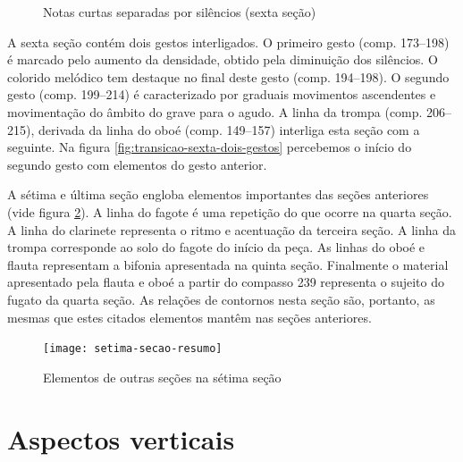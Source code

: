 \begin{figure}
  \centering


  \caption{Notas curtas separadas por silêncios (sexta seção)}
  \label{fig:sexta-secao-notas-curtas}
\end{figure}

A sexta seção contém dois gestos interligados. O primeiro gesto
(comp. 173--198) é marcado pelo aumento da densidade, obtido pela
diminuição dos silêncios. O colorido melódico tem destaque no final
deste gesto (comp. 194--198). O segundo gesto (comp. 199--214) é
caracterizado por graduais movimentos ascendentes e movimentação do
âmbito do grave para o agudo. A linha da trompa (comp. 206--215),
derivada da linha do oboé (comp. 149--157) interliga esta seção com a
seguinte. Na figura \ref{fig:transicao-sexta-dois-gestos} percebemos o
início do segundo gesto com elementos do gesto anterior.

A sétima e última seção engloba elementos importantes das seções
anteriores (vide figura \ref{fig:setima-secao-resumo}). A linha do
fagote é uma repetição do que ocorre na quarta seção. A linha do
clarinete representa o ritmo e acentuação da terceira seção. A linha
da trompa corresponde ao solo do fagote do início da peça. As linhas
do oboé e flauta representam a bifonia apresentada na quinta
seção. Finalmente o material apresentado pela flauta e oboé a partir
do compasso 239 representa o sujeito do fugato da quarta seção. As
relações de contornos nesta seção são, portanto, as mesmas que estes
citados elementos mantêm nas seções anteriores.

\begin{figure}
  \centering
  \texttt{[image: setima-secao-resumo]}
  \caption{Elementos de outras seções na sétima seção}
  \label{fig:setima-secao-resumo}
\end{figure}
\section{Aspectos verticais}
\label{sec:aspectos-verticais}


